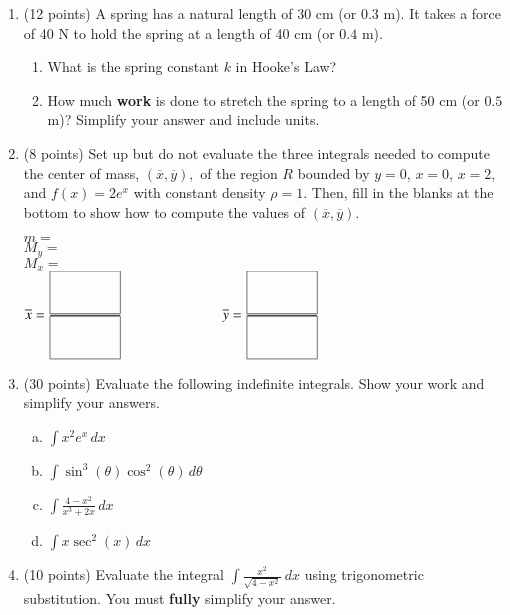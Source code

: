 \documentclass[12pt]{article}
\renewcommand{\emph}[1]{\textsf{\textbf{#1}}}
\begin{document}
\begin{enumerate}
\pagebreak

\item (12 points) A spring has a natural length of 30 cm (or $0.3$ m). It takes a force of 40 N to hold the spring at a length of 40 cm (or $0.4$ m). \\
\begin{enumerate}
	\item What is the spring constant $k$ in Hooke's Law?
	\vfill
	\item How much \textbf{work} is done to stretch the spring to a length of 50 cm  (or $0.5$ m)? Simplify your answer and include units.
	\vfill
	\end{enumerate}
\vfill 

\item (8 points) Set up but do not evaluate the three integrals needed to compute the center of mass, $(\overline{x},\overline{y}),$ of the region $R$ bounded by $y=0$, $x=0$, $x=2$, and $f(x)=2e^x$ with constant density $\rho=1.$ Then, fill in the blanks at the bottom to show how to compute the values of $(\overline{x},\overline{y}).$ 

\vfill
{\Large{$m=$}}\\

\vfill
{\Large{$M_y=$}}\\

\vfill
{\Large{$M_x=$}}\\

\vfill
{\Large{$\overline{x}=\frac{\framebox(50,30){}}{\framebox(50,30){}} \hspace{1in} \overline{y}=\frac{\framebox(50,30){}}{\framebox(50,30){}}$}}

\pagebreak

\item (30 points) Evaluate the following indefinite integrals. Show your work and simplify your answers.
\begin{enumerate}[(a)]
\item $\displaystyle \int x^2e^x \,dx$
\vfill
\item $\displaystyle \int \sin^3 (\theta) \cos^2 (\theta) \,d\theta$
\vfill
\newpage
\item $\displaystyle \int \frac{4-x^2}{x^3+2x}\,dx$
\vfill
\item $\displaystyle \int x\sec^2(x) \,dx$
\vfill
\end{enumerate}

\pagebreak

\item (10 points) Evaluate the integral $\displaystyle \int \frac{x^2}{\sqrt{4-x^2}} \: dx$ using trigonometric substitution. You must \emph{fully} simplify your answer.\\

\vfill

\end{enumerate}
\end{document}
